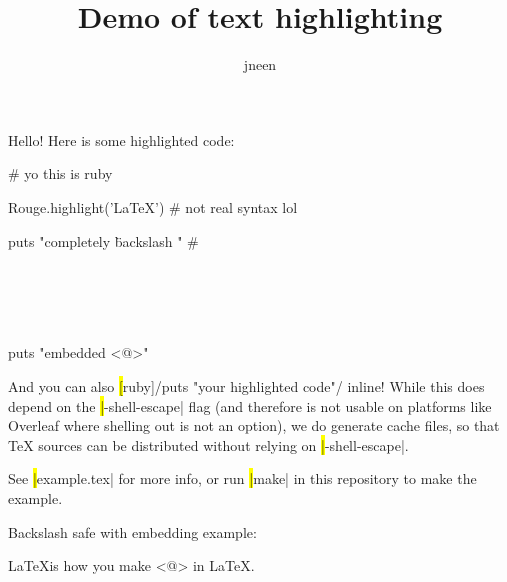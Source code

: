 \documentclass{article}
\begin{document}
\def\withcursor#1{\texttt{\textbf{%
  \fboxsep=0pt\colorbox{gray}{%
    \parbox[c][\height][c]{0.61em}{%
      \strut\textcolor{white}{#1}%
    }%
  }}%
}}
\def\cursormark{\withcursor{}}
\def\prompt{\textasciitilde>}

\title{Demo of text highlighting}
\author{jneen}

\maketitle

\noindent Hello! Here is some highlighted code:
\begin{hilite}[ruby]
# yo this is ruby

Rouge.highlight('LaTeX') # not real syntax lol

puts "completely \" backslash \safe" # \\\\\\\\\

puts "embedded <@\LaTeX@>"
\end{hilite}

\noindent And you can also \hl[ruby]/puts "your highlighted code"/ inline! While this does depend on the \hl|-shell-escape| flag (and therefore is not usable on platforms like Overleaf where shelling out is not an option), we do generate cache files, so that TeX sources can be distributed without relying on \hl|-shell-escape|.

See \hl|example.tex| for more info, or run \hl|make| in this repository to make the example.

Backslash safe with embedding example:
\begin{hilite}[tex]
\LaTeX is how you make <@\LaTeX@> in LaTeX.
\end{hilite}
\end{document}

